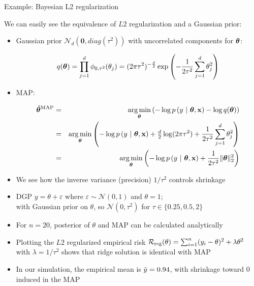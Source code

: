 \documentclass[11pt,compress,t,notes=noshow, xcolor=table]{beamer}
\begin{document}
\begin{vbframe}{Example: Bayesian L2 regularization}

\small We can easily see the equivalence of $L2$ regularization and a Gaussian 
prior:

\begin{itemize}
  \small
  \item Gaussian prior $\mathcal{N}_d(\bm{0}, \mathit{diag}(\tau^2))$ with uncorrelated components for $\bm{\theta}$:
  \begin{footnotesize}
    $$q(\bm{\theta}) = \prod_{j = 1}^d  \phi_{0,\tau^2}(\theta_j) 
    = (2\pi\tau^2)^{-\frac{d}{2}} \exp \left( - \frac{1}{2\tau^2} \sum_{j = 1}^d 
    \theta_j^2 \right)$$
  \end{footnotesize} 
  \item MAP:
  \begin{footnotesize}
  \begin{eqnarray*}
    \hat{\bm{\theta}}^{\text{MAP}} &=& \operatorname*{arg\,min}_{\bm{\theta}} \left(
    - \log p\left(y ~|~ \bm{\theta}, \mathbf{x} \right) - \log q(\bm{\theta})
    \right) \\
    &=& \operatorname*{arg\,min}_{\bm{\theta}} \left(
    - \log p\left(y ~|~ \bm{\theta}, \mathbf{x} \right) + \tfrac{d}{2} \log(2\pi \tau^2) +
    \frac{1}{2\tau^2} \sum_{j = 1}^d \theta_j^2
    \right) \\
    &=& \operatorname*{arg\,min}_{\bm{\theta}} \left(
    - \log p\left(y ~|~ \bm{\theta}, \mathbf{x} \right) + \frac{1}{2\tau^2} \| \bm{\theta} \|_2^2
    \right)
  \end{eqnarray*}
  \end{footnotesize} 
  \item We see how the inverse variance (precision) $1/\tau^2$ controls shrinkage
\end{itemize}

\framebreak

\begin{itemize}
    \item DGP $y = \theta + \varepsilon$ where $\varepsilon \sim \mathcal{N}(0,1)$ and $\theta=1$;\\
    with Gaussian prior on $\theta$, so $\mathcal{N}(0, \tau^2)$ for $\tau \in \{0.25, 0.5, 2\}$
    \item For $n=20$, posterior of $\theta$ and MAP can be calculated analytically
    \item Plotting the $L2$ regularized empirical risk $\mathcal{R}_{\text{reg}}(\theta) = \sum_{i=1}^{n} (y_i-\theta)^2+\lambda \theta^2$ with $\lambda = 1/\tau^2$ shows that ridge solution is identical with MAP
    \item In our simulation, the empirical mean is $\Bar{y}=0.94$, with shrinkage toward $0$ induced in the MAP
\end{itemize}


\end{vbframe}
\end{document}
